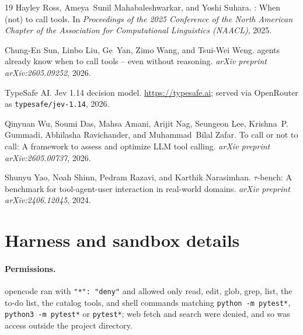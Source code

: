 \begin{thebibliography}{19}
Hayley Ross, Ameya~Sunil Mahabaleshwarkar, and Yoshi Suhara.
: When (not) to call tools.
\newblock In \emph{Proceedings of the 2025 Conference of the North American
  Chapter of the Association for Computational Linguistics (NAACL)}, 2025.

Chung-En Sun, Linbo Liu, Ge~Yan, Zimo Wang, and Tsui-Wei Weng.
 agents already know when to call tools -- even without
  reasoning.
\newblock \emph{arXiv preprint arXiv:2605.09252}, 2026.

{TypeSafe AI}.
\newblock Jev 1.14 decision model.
\newblock \url{https://typesafe.ai}; served via OpenRouter as
  \texttt{typesafe/jev-1.14}, 2026.

Qinyuan Wu, Soumi Das, Mahsa Amani, Arijit Nag, Seungeon Lee, Krishna~P.
  Gummadi, Abhilasha Ravichander, and Muhammad~Bilal Zafar.
\newblock To call or not to call: A framework to assess and optimize {LLM} tool
  calling.
\newblock \emph{arXiv preprint arXiv:2605.00737}, 2026.

Shunyu Yao, Noah Shinn, Pedram Razavi, and Karthik Narasimhan.
\newblock $\tau$-bench: A benchmark for tool-agent-user interaction in
  real-world domains.
\newblock \emph{arXiv preprint arXiv:2406.12045}, 2024.

\end{thebibliography}

\appendix
\section{Harness and sandbox details}\label{app:harness}
\paragraph{Permissions.} opencode ran with \texttt{"*": "deny"} and allowed only read, edit, glob, grep, list,
the to-do list, the catalog tools, and shell commands matching \texttt{python -m pytest*}, \texttt{python3 -m
pytest*} or \texttt{pytest*}; web fetch and search were denied, and so was access outside the project
directory.

